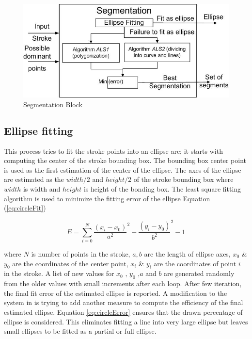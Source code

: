 \documentclass[10pt]{article}
\begin{document}
 \begin{figure}
	\centering
		\includegraphics[scale=0.48]{blockSmall.jpg}
	\caption{Segmentation Block}
	\label{fig:segblock}
\end{figure}
\subsection{Ellipse fitting}
This process tries to fit the stroke points into an ellipse arc; it starts with computing the center of the stroke bounding box. The bounding box center point is used as the first estimation of the center of the ellipse. The axes of the ellipse are estimated as the $width/2$ and $height/2$ of the stroke bounding box where $width$ is width and $height$ is height of the bonding box. The least square fitting algorithm \cite{chernov} is used to minimize the fitting error of the ellipse Equation (\ref{eq:circleFit})  

\begin{equation}
E = \sum\limits_{i = 0}^N {\frac{{(x_i - x_0 )}}{{a^2 }}^2  + \frac{{(y_i - y_0 )}}{{b^2 }}^2  - 1} 
\label{eq:circleFit}
\end{equation}

 where $N$ is number of points in the stroke, $a,b$ are the length of ellipse axes, $x_0$ \& $y_0$ are the coordinates of the center point, $x_i$ \& $y_i$ are the coordinates of point $i$ in the stroke. A list of new values for $x_0$ , $y_0$ ,$a$ and $b$ are generated randomly from the older values with small increments after each loop.  After few iteration, the final fit error of the estimated ellipse is reported. A modification to the system in \cite{mypaper} is trying to add another measure to compute the efficiency of the final estimated ellipse. Equation \ref{eq:circleError} ensures that the drawn percentage of ellipse is considered. This eliminates fitting a line into very large ellipse but leaves small ellipses to be fitted as a partial or full ellipse. 
\end{document}
